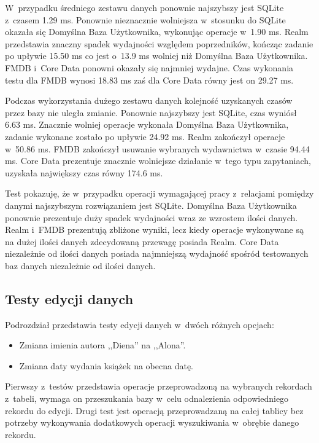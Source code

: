  W~przypadku średniego zestawu danych ponownie najszybszy jest SQLite z~czasem 1.29 ms. Ponownie nieznacznie wolniejsza w~stosunku do SQLite okazała się Domyślna Baza Użytkownika, wykonując operacje w~1.90 ms. Realm przedstawia znaczny spadek wydajności względem poprzedników, kończąc zadanie po upływie 15.50 ms co jest o~13.9 ms wolniej niż Domyślna Baza Użytkownika. FMDB i~Core Data ponowni okazały się najmniej wydajne. Czas wykonania testu dla FMDB wynosi 18.83 ms zaś dla Core Data równy jest on 29.27 ms.

Podczas wykorzystania dużego zestawu danych kolejność uzyskanych czasów przez bazy nie uległa zmianie. Ponownie najszybszy jest SQLite, czas wyniósł 6.63 ms. Znacznie wolniej operacje wykonała Domyślna Baza Użytkownika, zadanie wykonane zostało po upływie 24.92 ms. Realm zakończył operacje w~50.86 ms. FMDB zakończył usuwanie wybranych wydawnictwa w~czasie 94.44 ms. Core Data prezentuje znacznie wolniejsze działanie w~tego typu zapytaniach, uzyskała największy czas równy 174.6 ms. 

Test pokazuję, że w~przypadku operacji wymagającej pracy z~relacjami pomiędzy danymi najszybszym rozwiązaniem jest SQLite. Domyślna Baza Użytkownika ponownie prezentuje duży spadek wydajności wraz ze wzrostem ilości danych. Realm i~FMDB prezentują zbliżone wyniki, lecz kiedy operacje wykonywane są na dużej ilości danych zdecydowaną przewagę posiada Realm. Core Data niezależnie od ilości danych posiada najmniejszą wydajność spośród testowanych baz danych niezależnie od ilości danych.

\subsection{Testy edycji danych}

Podrozdział przedstawia testy edycji danych w~dwóch różnych opcjach: 

\begin{itemize}
\item Zmiana imienia autora ,,Diena'' na ,,Alona''.
\item Zmiana daty wydania książek na obecna datę.
\end{itemize}

Pierwszy z~testów przedstawia operacje przeprowadzoną na wybranych rekordach z~tabeli, wymaga on przeszukania bazy w~celu odnalezienia odpowiedniego rekordu do edycji. Drugi test jest operacją przeprowadzaną na całej tablicy bez potrzeby wykonywania dodatkowych operacji wyszukiwania w~obrębie danego rekordu.

